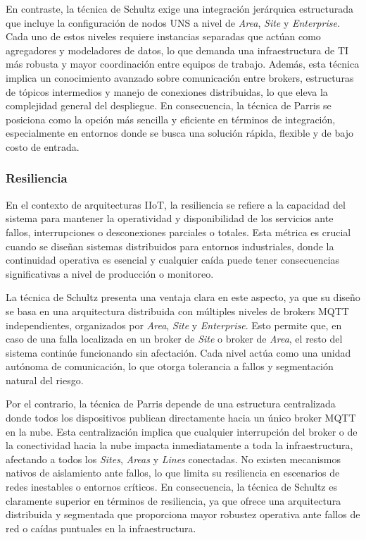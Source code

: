 En contraste, la técnica de Schultz exige una integración jerárquica estructurada que incluye la configuración de nodos UNS a nivel de \textit{Area}, \textit{Site} y \textit{Enterprise}. Cada uno de estos niveles requiere instancias separadas que actúan como agregadores y modeladores de datos, lo que demanda una infraestructura de TI más robusta y mayor coordinación entre equipos de trabajo. Además, esta técnica implica un conocimiento avanzado sobre comunicación entre brokers, estructuras de tópicos intermedios y manejo de conexiones distribuidas, lo que eleva la complejidad general del despliegue. En consecuencia, la técnica de Parris se posiciona como la opción más sencilla y eficiente en términos de integración, especialmente en entornos donde se busca una solución rápida, flexible y de bajo costo de entrada.

\subsubsection{Resiliencia}
En el contexto de arquitecturas IIoT, la resiliencia se refiere a la capacidad del sistema para mantener la operatividad y disponibilidad de los servicios ante fallos, interrupciones o desconexiones parciales o totales. Esta métrica es crucial cuando se diseñan sistemas distribuidos para entornos industriales, donde la continuidad operativa es esencial y cualquier caída puede tener consecuencias significativas a nivel de producción o monitoreo.

La técnica de Schultz presenta una ventaja clara en este aspecto, ya que su diseño se basa en una arquitectura distribuida con múltiples niveles de brokers MQTT independientes, organizados por \textit{Area}, \textit{Site} y \textit{Enterprise}. Esto permite que, en caso de una falla localizada en un broker de \textit{Site} o broker de \textit{Area}, el resto del sistema continúe funcionando sin afectación. Cada nivel actúa como una unidad autónoma de comunicación, lo que otorga tolerancia a fallos y segmentación natural del riesgo.

Por el contrario, la técnica de Parris depende de una estructura centralizada donde todos los dispositivos publican directamente hacia un único broker MQTT en la nube. Esta centralización implica que cualquier interrupción del broker o de la conectividad hacia la nube impacta inmediatamente a toda la infraestructura, afectando a todos los \textit{Sites}, \textit{Areas} y \textit{Lines} conectadas. No existen mecanismos nativos de aislamiento ante fallos, lo que limita su resiliencia en escenarios de redes inestables o entornos críticos. En consecuencia, la técnica de Schultz es claramente superior en términos de resiliencia, ya que ofrece una arquitectura distribuida y segmentada que proporciona mayor robustez operativa ante fallos de red o caídas puntuales en la infraestructura.

